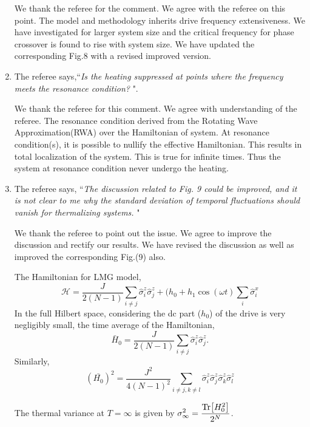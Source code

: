\documentclass[aps,prb,reprint,showpacs,floatfix,superscriptaddress, onecolumn, nofootinbib, 9pt]{revtex4-2}
\newcommand{\response}[1]{{\color{blue}#1}} %
\begin{document}
\begin{enumerate}
\response{    	
We thank the referee for the comment. We agree with the referee on this point. The model and methodology inherits drive frequency extensiveness. We have investigated for larger system size and the critical frequency for phase crossover is found to rise with system size. We have updated the corresponding Fig.8 with a revised improved version.
}
\item The referee says,``\textit{Is the heating suppressed at points where the frequency meets the resonance condition? }".

\response{
We thank the referee for this comment. We agree with understanding of the referee. The resonance condition derived from the Rotating Wave Approximation(RWA) over the Hamiltonian of system. At resonance condition(s), it is possible to nullify the effective Hamiltonian. This results in total localization of the system. This is true for infinite times. Thus the system at resonance condition never undergo the heating.
}

\item The referee says, ``\textit{The discussion related to Fig. 9 could be improved, and it is not clear to me why the standard deviation of temporal fluctuations should vanish for thermalizing systems. }"\\

\response{ We thank the referee to point out the issue. We agree to improve the discussion and rectify our results. We have revised the discussion as well as improved the corresponding Fig.(9) also.


The Hamiltonian for LMG model,
\begin{equation}
\mathcal{H} = \frac{J}{2(N-1)}\sum_{i\neq j}\hat{\sigma}^z_i \hat{\sigma}^z_j + (h_0 +h_1 \cos(\omega t) \sum_i \hat{\sigma}^x_i
\end{equation}
In the full Hilbert space, considering the dc part ($h_0$) of the drive is very negligibly small, the time average of the Hamiltonian,
\begin{equation*}
	\bar{H}_0 = \frac{J}{2(N-1)}\sum_{i\neq j}\hat{\sigma}^z_i \hat{\sigma}^z_j.
\end{equation*}
Similarly,
\begin{equation}
	\left(\bar{H_0}\right)^2 = \frac{J^2}{4(N-1)^2}\sum_{i\neq j, k \neq l} \hat{\sigma}^z_i \hat{\sigma}^z_j \hat{\sigma}^z_k \hat{\sigma}^z_l
\end{equation}

The thermal variance at $T= \infty$ is given by $\displaystyle \sigma^2_{\infty} = \frac{\Tr[H^2_0]}{2^N}$. 

}
\end{enumerate}
\end{document}
